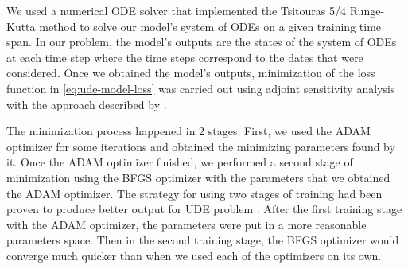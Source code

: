 We used a numerical \gls{ODE} solver that implemented the Tsitouras 5/4 Runge-Kutta method \cite{tsitourasRungeKuttaPairs2011} to solve our model's system of \glspl{ODE} on a given training time span.
In our problem, the model's outputs are the states of the system of \glspl{ODE} at each time step where the time steps correspond to the dates that were considered.
Once we obtained the model's outputs, minimization of the loss function in \autoref{eq:ude-model-loss} was carried out using adjoint sensitivity analysis \cite{maComparisonAutomaticDifferentiation2021} with the approach described by \citeauthor{rackauckasUniversalDifferentialEquations2020} \cite{rackauckasUniversalDifferentialEquations2020}.

The minimization process happened in 2 stages.
First, we used the ADAM optimizer \cite{kingmaAdamMethodStochastic2017} for some iterations and obtained the minimizing parameters found by it.
Once the ADAM optimizer finished, we performed a second stage of minimization using the BFGS optimizer \cite{broydenConvergenceClassDoublerank1970, fletcherNewApproachVariable1970, goldfarbFamilyVariablemetricMethods1970, shannoConditioningQuasiNewtonMethods1970} with the parameters that we obtained the ADAM optimizer.
The strategy for using two stages of training had been proven to produce better output for \gls{UDE} problem \cite{rackauckasUniversalDifferentialEquations2020}.
After the first training stage with the ADAM optimizer, the parameters were put in a more reasonable parameters space.
Then in the second training stage, the BFGS optimizer would converge much quicker than when we used each of the optimizers on its own.
